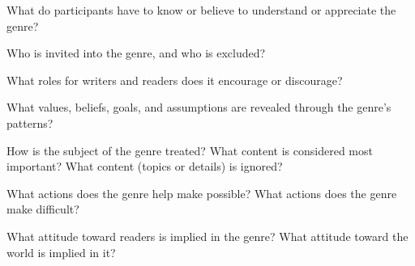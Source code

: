 \documentclass[10pt,article,oneside,twocolumn]{memoir}
\begin{document}
\begin{compactitem}
	\item What do participants have to know or believe to understand or appreciate the genre? 
	\item Who is invited into the genre, and who is excluded? 
	\item What roles for writers and readers does it encourage or discourage? 
	\item What values, beliefs, goals, and assumptions are revealed through the genre’s patterns? 
	\item How is the subject of the genre treated? What content is considered most important? What content (topics or details) is ignored? 
	\item What actions does the genre help make possible? What actions does the genre make difficult? 
	\item What attitude toward readers is implied in the genre? What attitude toward the world is implied in it?
\end{compactitem}





\end{document}
